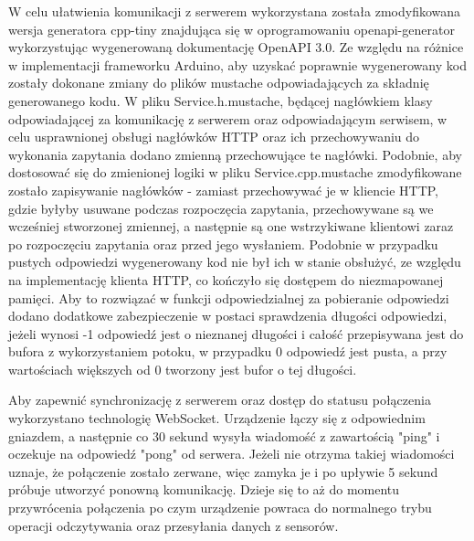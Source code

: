 W celu ułatwienia komunikacji z serwerem wykorzystana została zmodyfikowana wersja
generatora cpp-tiny znajdująca się w oprogramowaniu openapi-generator wykorzystując
wygenerowaną dokumentację OpenAPI 3.0. 
Ze względu na różnice w implementacji frameworku Arduino, aby uzyskać poprawnie 
wygenerowany kod zostały dokonane zmiany do plików mustache odpowiadających za składnię
generowanego kodu. W pliku Service.h.mustache, będącej nagłówkiem klasy odpowiadającej za komunikację z serwerem
oraz odpowiadającym serwisem, w celu usprawnionej obsługi nagłówków
HTTP oraz ich przechowywaniu do wykonania zapytania dodano zmienną przechowujące te nagłówki.
Podobnie, aby dostosować się do zmienionej logiki w pliku Service.cpp.mustache zmodyfikowane
zostało zapisywanie nagłówków - zamiast przechowywać je w kliencie HTTP, gdzie byłyby usuwane podczas
rozpoczęcia zapytania, przechowywane są we wcześniej stworzonej zmiennej, a następnie są one
wstrzykiwane klientowi zaraz po rozpoczęciu zapytania oraz przed jego wysłaniem.
Podobnie w przypadku pustych odpowiedzi wygenerowany kod nie był ich w stanie obsłużyć,
ze względu na implementację klienta HTTP, co kończyło się dostępem do niezmapowanej pamięci. 
Aby to rozwiązać w funkcji odpowiedzialnej 
za pobieranie odpowiedzi dodano dodatkowe zabezpieczenie w postaci sprawdzenia
długości odpowiedzi, jeżeli wynosi -1 odpowiedź jest o nieznanej długości i całość przepisywana jest
do bufora z wykorzystaniem potoku, w przypadku 0 odpowiedź jest pusta, a przy wartościach większych od
0 tworzony jest bufor o tej długości.

Aby zapewnić synchronizację z serwerem oraz dostęp do statusu połączenia wykorzystano
technologię WebSocket. Urządzenie łączy się z odpowiednim gniazdem, a następnie co 30
sekund wysyła wiadomość z zawartością "ping" i oczekuje na odpowiedź "pong" od serwera.
Jeżeli nie otrzyma takiej wiadomości uznaje, że połączenie zostało zerwane, więc zamyka je
i po upływie 5 sekund próbuje utworzyć ponowną komunikację. Dzieje się to aż do momentu przywrócenia
połączenia po czym urządzenie powraca do normalnego trybu operacji odczytywania oraz
przesyłania danych z sensorów.


